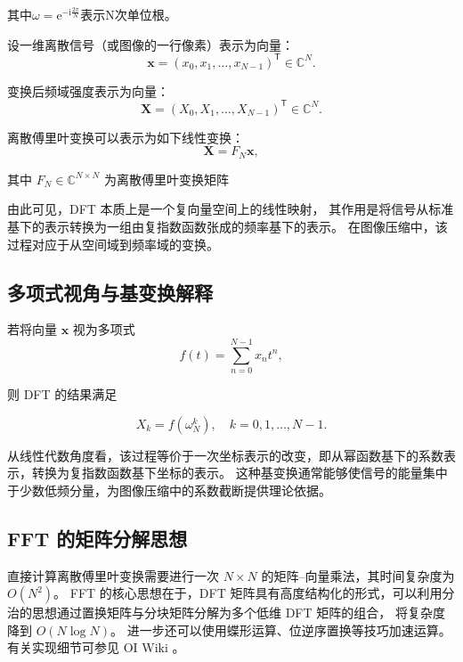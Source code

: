 \documentclass[12pt,a4paper]{article}
\begin{document}
其中$\omega = \mathrm{e}^{-\mathrm{i}\frac{2\pi}{N}}$表示N次单位根。


设一维离散信号（或图像的一行像素）表示为向量：
\begin{equation*}
\mathbf{x} = (x_0, x_1, \dots, x_{N-1})^\mathsf{T} \in \mathbb{C}^N.
\end{equation*}

变换后频域强度表示为向量：
\begin{equation*}
\mathbf{X} = (X_0, X_1, \dots, X_{N-1})^\mathsf{T} \in \mathbb{C}^N.
\end{equation*}

离散傅里叶变换可以表示为如下线性变换：
\begin{equation}
\mathbf{X} = F_N \mathbf{x},
\end{equation}

其中 $F_N \in \mathbb{C}^{N \times N}$ 为离散傅里叶变换矩阵

由此可见，DFT 本质上是一个复向量空间上的线性映射，
其作用是将信号从标准基下的表示转换为一组由复指数函数张成的频率基下的表示。
在图像压缩中，该过程对应于从空间域到频率域的变换。

\subsection{多项式视角与基变换解释}

若将向量 $\mathbf{x}$ 视为多项式
\begin{equation*}
f(t) = \sum_{n=0}^{N-1} x_n t^n,
\end{equation*}

则 DFT 的结果满足

\begin{equation*}
X_k = f(\omega_N^k), \quad k = 0,1,\dots,N-1.
\end{equation*}

从线性代数角度看，该过程等价于一次坐标表示的改变，即从幂函数基下的系数表示，转换为复指数函数基下坐标的表示。
这种基变换通常能够使信号的能量集中于少数低频分量，为图像压缩中的系数截断提供理论依据。

\subsection{FFT 的矩阵分解思想}

直接计算离散傅里叶变换需要进行一次 $N \times N$ 的矩阵--向量乘法，其时间复杂度为 $O(N^2)$。
FFT 的核心思想在于，DFT 矩阵具有高度结构化的形式，可以利用分治的思想通过置换矩阵与分块矩阵分解为多个低维 DFT 矩阵的组合，
将复杂度降到 $O(N \log N)$。
进一步还可以使用蝶形运算、位逆序置换等技巧加速运算。有关实现细节可参见 OI Wiki \cite{oiwiki}。
\end{document}
